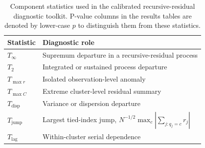 \begin{table}[H]
\centering
\caption{Component statistics used in the calibrated recursive-residual diagnostic toolkit. P-value columns in the results tables are denoted by lower-case $p$ to distinguish them from these statistics.}
\label{tab:component-statistics}
\begin{tabular}{ll}
\toprule
Statistic & Diagnostic role \\
\midrule
$T_\infty$ & Supremum departure in a recursive-residual process \\
$T_2$ & Integrated or sustained process departure \\
$T_{\max r}$ & Isolated observation-level anomaly \\
$T_{\max C}$ & Extreme cluster-level residual summary \\
$T_{\mathrm{disp}}$ & Variance or dispersion departure \\
$T_{\mathrm{jump}}$ & Largest tied-index jump, $N^{-1/2}\max_c |\sum_{j:q_j=c} r_j|$ \\
$T_{\mathrm{lag}}$ & Within-cluster serial dependence \\
\bottomrule
\end{tabular}
\end{table}
